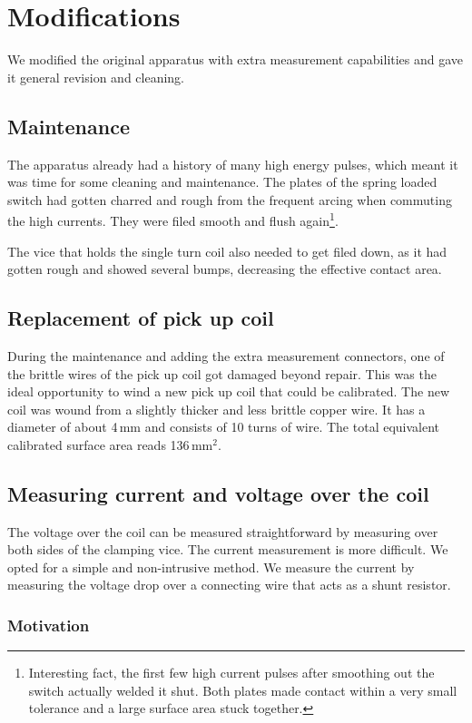 \section{Modifications}
We modified the original apparatus with extra measurement capabilities and 
gave it general revision and cleaning.

\subsection{Maintenance}
The apparatus already had a history of many high energy pulses, which meant 
it was time for some cleaning and maintenance. The plates of the spring 
loaded switch had gotten charred and rough from the frequent arcing when 
commuting the high currents. They were filed smooth and flush 
again\footnote{Interesting fact, the first few high current pulses after 
smoothing out the switch actually welded it shut. Both plates made contact 
within a very small tolerance and a large surface area stuck together.}.

The vice that holds the single turn coil also needed to get filed down, as 
it had gotten rough and showed several bumps, decreasing the effective 
contact area.

\subsection{Replacement of pick up coil}
During the maintenance and adding the extra measurement connectors, one of 
the brittle wires of the pick up coil got damaged beyond repair. This was 
the ideal opportunity to wind a new pick up coil that could be calibrated. 
The new coil was wound from a slightly thicker and less brittle copper 
wire. It has a diameter of about 4\,mm and consists of 10 turns of wire. 
The total equivalent calibrated surface area reads 136\,mm$^2$.

\subsection{Measuring current and voltage over the coil}

The voltage over the coil can be measured straightforward by measuring over 
both sides of the clamping vice. The current measurement is more difficult.  We 
opted for a simple and non-intrusive method. We measure the current by 
measuring the voltage drop over a connecting wire that acts as a shunt 
resistor.

\subsubsection{Motivation}

